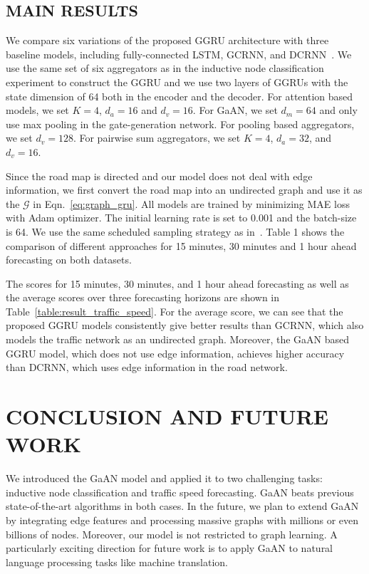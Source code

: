 \documentclass{article}
\begin{document}
	\subsection{MAIN RESULTS}
	
	We compare six variations of the proposed GGRU architecture with three baseline models, including fully-connected LSTM, GCRNN, and DCRNN~\citep{li2017graph}. We use the same set of six aggregators as in the inductive node classification experiment to construct the GGRU and we use two layers of GGRUs with the state dimension of 64 both in the encoder and the decoder. For attention based models, we set $K=4$, $d_a=16$ and $d_v=16$. For GaAN, we set $d_m=64$ and only use max pooling in the gate-generation network. For pooling based aggregators, we set $d_v=128$. For pairwise sum aggregators, we set $K=4$, $d_a=32$, and $d_v=16$.
	
	Since the road map is directed and our model does not deal with edge information, we first convert the road map into an undirected graph and use it as the $\mathcal{G}$ in Eqn.~\eqref{eq:graph_gru}. All models are trained by minimizing MAE loss with Adam optimizer. The initial learning rate is set to 0.001 and the batch-size is 64. We use the same scheduled sampling strategy as in~\citep{li2017graph}. 
	Table 1 shows the comparison of different approaches for 15 minutes, 30 minutes and 1 hour ahead
	forecasting on both datasets.
	
	The scores for 15 minutes, 30 minutes, and 1 hour ahead forecasting as well as the average scores over three forecasting horizons are shown in Table~\ref{table:result_traffic_speed}. 
	For the average score, we can see that the proposed GGRU models consistently give better results than GCRNN, which also models the traffic network as an undirected graph. Moreover, the GaAN based GGRU model, which does not use edge information, achieves higher accuracy than DCRNN, which uses edge information in the road network.
	
	
\section{CONCLUSION AND FUTURE WORK}
	
	We introduced the GaAN model and applied it to two challenging tasks: inductive node classification and traffic speed forecasting. GaAN beats previous state-of-the-art algorithms in both cases. In the future, we plan to extend GaAN by integrating edge features and processing massive graphs with millions or even billions of nodes. 
Moreover, our model is not restricted to graph learning. A particularly exciting direction for future work is to apply GaAN to natural language processing tasks like machine translation.
	
	\newpage
	
	


	
	
	
\end{document}
